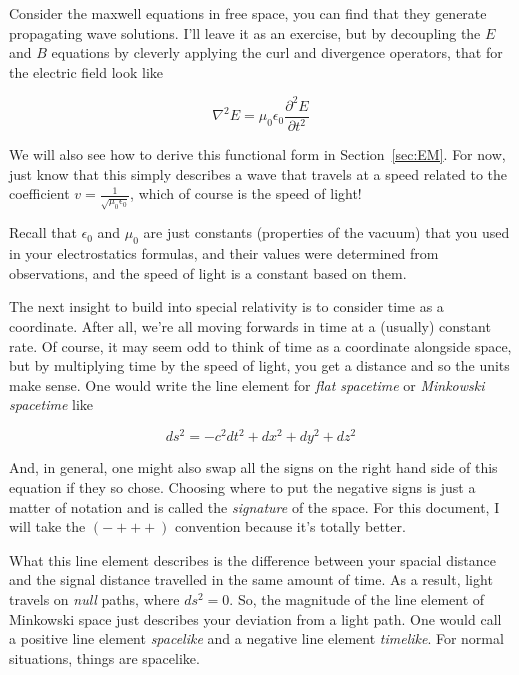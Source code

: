 \documentclass{article}
\begin{document}
Consider the maxwell equations in free space, you can find that they generate propagating wave solutions. I'll leave it as an exercise, but by decoupling the $E$ and $B$ equations by cleverly applying the curl and divergence operators, that for the electric field look like

\begin{equation}
    \nabla^2E = \mu_0\epsilon_0 \frac{\partial^2 E}{\partial t^2}
\end{equation}

We will also see how to derive this functional form in Section~\ref{sec:EM}. For now, just know that this simply describes a wave that travels at a speed related to the coefficient $v = \frac{1}{\sqrt{\mu_0 \epsilon_0}}$, which of course is the speed of light!

Recall that $\epsilon_0$ and $\mu_0$ are just constants (properties of the vacuum) that you used in your electrostatics formulas, and their values were determined from observations, and the speed of light is a constant based on them.

The next insight to build into special relativity is to consider time as a coordinate. After all, we're all moving forwards in time at a (usually) constant rate. Of course, it may seem odd to think of time as a coordinate alongside space, but by multiplying time by the speed of light, you get a distance and so the units make sense. One would write the line element for \textit{flat spacetime} or \textit{Minkowski spacetime} like

\begin{equation}
    ds^2 = -c^2dt^2 + dx^2 + dy^2 + dz^2
\end{equation}

And, in general, one might also swap all the signs on the right hand side of this equation if they so chose. Choosing where to put the negative signs is just a matter of notation and is called the \textit{signature} of the space. For this document, I will take the $(-+++)$ convention because it's totally better.

What this line element describes is the difference between your spacial distance and the signal distance travelled in the same amount of time. As a result, light travels on \textit{null} paths, where $ds^2=0$. So, the magnitude of the line element of Minkowski space just describes your deviation from a light path. One would call a positive line element \textit{spacelike} and a negative line element \textit{timelike}. For normal situations, things are spacelike.
\end{document}

